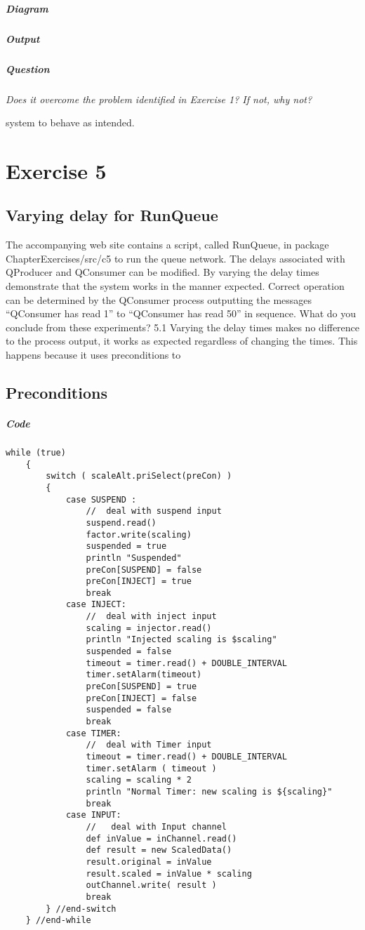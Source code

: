 \documentclass[10pt, a4paper]{article}
\begin{document}
	\subparagraph{Diagram}
	
	\subparagraph{Output}
	
	\subparagraph{Question}
	\hfill
	\textit{Does it overcome the problem identified in Exercise 1? If not, why not?}
	
	system to behave as intended.

	\setcounter{section}{5}
	\section*{Exercise 5}
	
	\setcounter{subsection}{0}
	\subsection{Varying delay for RunQueue}
	
	   The accompanying web site contains a script, called RunQueue, in package ChapterExercises/src/c5 to run the queue network.  The delays associated with QProducer and QConsumer can be modified.  By varying the delay times demonstrate that the system works in the manner expected.  Correct operation can be determined by the QConsumer process outputting the messages “QConsumer has read 1” to “QConsumer has read 50” in sequence.  What do you conclude from these experiments?
	5.1 
	Varying the delay times makes no difference to the process output, it works as expected regardless of changing the times. This happens because it uses preconditions to 
	
	
	\subsection{Preconditions}
	
	\subparagraph{Code} \hfill
	
	\begin{lstlisting}[caption = "Scale.groovy"]
	while (true)
	{
		switch ( scaleAlt.priSelect(preCon) )
		{
			case SUSPEND :
				//  deal with suspend input      
				suspend.read()
				factor.write(scaling)
				suspended = true
				println "Suspended"		
				preCon[SUSPEND] = false
				preCon[INJECT] = true  
				break
			case INJECT:
				//  deal with inject input
				scaling = injector.read()
				println "Injected scaling is $scaling"
				suspended = false
				timeout = timer.read() + DOUBLE_INTERVAL
				timer.setAlarm(timeout)
				preCon[SUSPEND] = true
				preCon[INJECT] = false
				suspended = false
				break
			case TIMER:
				//  deal with Timer input
				timeout = timer.read() + DOUBLE_INTERVAL
				timer.setAlarm ( timeout )
				scaling = scaling * 2
				println "Normal Timer: new scaling is ${scaling}"
				break
			case INPUT:
				//   deal with Input channel 
				def inValue = inChannel.read()
				def result = new ScaledData()
				result.original = inValue
				result.scaled = inValue * scaling
				outChannel.write( result )
				break
		} //end-switch
	} //end-while		\end{lstlisting}
	
\end{document}
